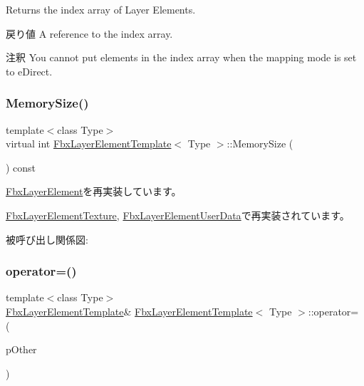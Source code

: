 Returns the index array of Layer Elements. \begin{DoxyReturn}{戻り値}
A reference to the index array. 
\end{DoxyReturn}
\begin{DoxyRemark}{注釈}
You cannot put elements in the index array when the mapping mode is set to e\+Direct. 
\end{DoxyRemark}
\mbox{\label{class_fbx_layer_element_template_aa6a7b5ed38b51d4a903f9ed2e715ee79}} 
\subsubsection{\texorpdfstring{Memory\+Size()}{MemorySize()}}
{\footnotesize\ttfamily template$<$class Type$>$ \\
virtual int \hyperlink{class_fbx_layer_element_template}{Fbx\+Layer\+Element\+Template}$<$ Type $>$\+::Memory\+Size (\begin{DoxyParamCaption}{ }\end{DoxyParamCaption}) const\hspace{0.3cm}{\ttfamily [virtual]}}



\hyperlink{class_fbx_layer_element_a15654a170f2d2952bf1eafad65262b8b}{Fbx\+Layer\+Element}を再実装しています。



\hyperlink{class_fbx_layer_element_texture_aa6ee4c7c56a71d1a3f70fa4e0806e1f5}{Fbx\+Layer\+Element\+Texture}, \hyperlink{class_fbx_layer_element_user_data_aa02fc5861dec4da68293f9660d4ff13b}{Fbx\+Layer\+Element\+User\+Data}で再実装されています。

被呼び出し関係図\+:
\mbox{\label{class_fbx_layer_element_template_ab92b474682b154297b72188986684fd7}} 
\subsubsection{\texorpdfstring{operator=()}{operator=()}}
{\footnotesize\ttfamily template$<$class Type$>$ \\
\hyperlink{class_fbx_layer_element_template}{Fbx\+Layer\+Element\+Template}\& \hyperlink{class_fbx_layer_element_template}{Fbx\+Layer\+Element\+Template}$<$ Type $>$\+::operator= (\begin{DoxyParamCaption}\item[{\hyperlink{class_fbx_layer_element_template}{Fbx\+Layer\+Element\+Template}$<$ Type $>$ const \&}]{p\+Other }\end{DoxyParamCaption})}


